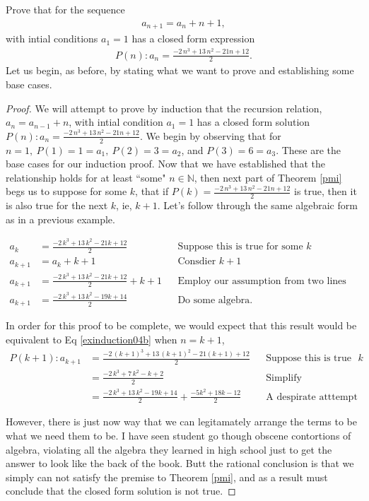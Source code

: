 \begin{example}[$a_1 =1 \textrm{ and } a_n = a_{n-1} + n, ~\forall n$]
Prove that for the sequence
\begin{eqnarray}
 a_{n+1} = a_{n} + n+1, \label{exinduction04a}
 \end{eqnarray}
   with intial conditions $a_1 =1$  has a closed form expression 
 \begin{eqnarray}
 P(n): a_n = \frac{-2\,n^3+13\,n^2-21n+12}{2}. \label{exinduction04b}
 \end{eqnarray}
Let us begin, as before, by stating what we want to prove and establishing some base cases.
\begin{proof}
We will attempt to prove by induction that the recursion relation, $a_n = a_{n-1} + n$, with intial condition $a_1 =1$ has a closed form solution  $P(n): a_n = \frac{-2\,n^3+13\,n^2-21n+12}{2}.$  We begin by observing that for $n=1,~ P(1) = 1 = a_1,~ P(2) = 3 = a_2$, and $P(3) = 6=a_3$.  These are the base cases for our induction proof.  Now that we have established that the relationship holds for at least ``some" $n\in \mathbb{N}$, then next part of Theorem \ref{pmi} begs us to suppose for some $k$, that if $P(k) = \frac{-2\,n^3+13\,n^2-21n+12}{2}$ is true, then it is also true for the next $k$, ie, $k+1$.  Let's follow through the same algebraic form as in a previous example.

\begin{align*}
 a_{k} &= \frac{-2\,k^3+13\,k^2-21k+12}{2}				& &\textrm{Suppose this is true for some $k$}\\
 a_{k+1} &= a_{k} + k+1						& &\textrm{Consdier $k+1$}\\
 a_{k+1}&=  \frac{-2\,k^3+13\,k^2-21k+12}{2} +k+1				& &\textrm{Employ our assumption from two lines above.}\\
 a_{k+1}&=  \frac{-2\,k^3+13\,k^2-19k+14}{2} 				& &\textrm{Do some algebra.}
\end{align*}

In order for this proof to be complete, we would expect that this result would be equivalent to Eq \ref{exinduction04b} when $n=k+1$, 
\begin{align*}
 P(k+1): a_{k+1}& = \frac{-2\,(k+1)^3+13\,(k+1)^2-21(k+1)+12}{2}			& &\textrm{Suppose this is true for some $k$}\\
&= \frac{-2\,k^3+7\,k^2-k+2}{2}							& &\textrm{Simplify}\\
&=  \frac{-2\,k^3+13\,k^2-19k+14}{2} 	+ \frac{-5k^2+18k-12}{2}			& &\textrm{A despirate atttempt to make things look that same.}
\end{align*}


However, there is just now way that we can legitamately arrange the terms to be what we need them to be.  I have seen student go though obscene contortions of algebra, violating all the algebra they learned in high school just to get the answer to look like the back of the book.  Butt the rational conclusion is that we simply can not satisfy the premise to Theorem \ref{pmi}, and as a result must conclude that the closed form solution is not true.
\end{proof}
\end{example}



